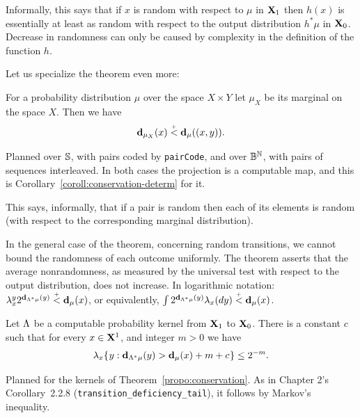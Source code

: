 Informally, this says that if \( x \) is random with respect to \( \mu \) in
\( \mathbf{X}_{1} \) then \( h(x) \) is essentially at least as random with respect to the
output distribution \( h^{*}\mu \) in \( \mathbf{X}_{0} \).
Decrease in randomness
can only be caused by complexity in the definition of the function \( h \).

Let us specialize the theorem even more:

\begin{corollary}\label{coroll:conservation-pair}
For a probability distribution \( \mu \) over the space \( X\times Y \)
let \( \mu_{X} \) be its marginal on the space \( X \).
Then we have
 \begin{align*}
   \mathbf{d}_{\mu_{X}}(x) \stackrel{{}_+}{<} \mathbf{d}_{\mu}((x,y)).
 \end{align*}
\end{corollary}

\begin{formalization}
Planned over $\mathbb{S}$, with pairs coded by \texttt{pairCode}, and over $\mathbb{B}^{\mathbb{N}}$, with pairs of
sequences interleaved. In both cases the projection is a computable map, and this is
Corollary~\ref{coroll:conservation-determ} for it.
\end{formalization}

This says, informally, that if a pair is random then each of its elements is
random (with respect to the corresponding marginal distribution).

In the general case of the theorem, concerning random transitions,
we cannot bound the randomness of each outcome uniformly.
The theorem asserts that the average nonrandomness, as measured by 
the universal test with respect to the output distribution, does not
increase.
In logarithmic notation:
\( \lambda_{x}^{y} 2^{\mathbf{d}_{\Lambda^{*}\mu}(y)} \stackrel{{}_+}{<} \mathbf{d}_{\mu}(x) \), 
or equivalently, 
\( \int 2^{\mathbf{d}_{\Lambda^{*}\mu}(y)} \lambda_{x}(dy) \stackrel{{}_+}{<} \mathbf{d}_{\mu}(x) \).

 \begin{corollary}
  \label{cor:g4.1.12}
Let \( \Lambda \) be a computable probability kernel from \( \mathbf{X}_{1} \) to \( \mathbf{X}_{0} \).
There is a constant \( c \) such that
for every \( x\in\mathbf{X}^{1} \), and integer \( m > 0 \) we have 
 \[
 \lambda_{x}\mathopen\{\mskip 1mu y : \mathbf{d}_{\Lambda^{*}\mu}(y) > \mathbf{d}_{\mu}(x) + m + c\mskip 1mu\mathclose\} \le 2^{-m}.
 \]
 \end{corollary}

\begin{formalization}
Planned for the kernels of Theorem~\ref{propo:conservation}. As in Chapter 2's
Corollary~2.2.8 (\texttt{transition\_deficiency\_tail}), it follows by Markov's inequality.
\end{formalization}

